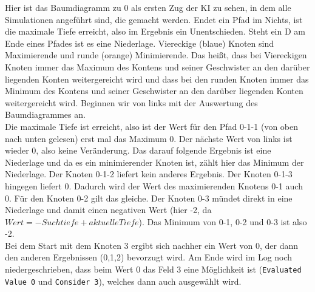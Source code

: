 \documentclass[12pt,a4paper]{article}
\def\code#1{\texttt{#1}}
\begin{document}
	Hier ist das Baumdiagramm zu 0 als ersten Zug der KI zu sehen, in dem alle Simulationen angeführt sind, die gemacht werden. Endet ein Pfad im Nichts, ist die maximale Tiefe erreicht, also im Ergebnis ein Unentschieden. Steht ein D am Ende eines Pfades ist es eine Niederlage. Viereckige (blaue) Knoten sind Maximierende und runde (orange) Minimierende. Das heißt, dass bei Viereckigen Knoten immer das Maximum des Kontens und seiner Geschwister an den darüber liegenden Konten weitergereicht wird und dass bei den runden Knoten immer das Minimum des Kontens und seiner Geschwister an den darüber liegenden Konten weitergereicht wird. Beginnen wir von links mit der Auswertung des Baumdiagrammes an.\\ Die maximale Tiefe ist erreicht, also ist der Wert für den Pfad 0-1-1 (von oben nach unten gelesen) erst mal das Maximum 0. Der nächste Wert von links ist wieder 0, also keine Veränderung. Das darauf folgende Ergebnis ist eine Niederlage und da es ein minimierender Knoten ist, zählt hier das Minimum der Niederlage. Der Knoten 0-1-2 liefert kein anderes Ergebnis. Der Knoten 0-1-3 hingegen liefert 0. Dadurch wird der Wert des maximierenden Knotens 0-1 auch 0. Für den Knoten 0-2 gilt das gleiche. Der Knoten 0-3 mündet direkt in eine Niederlage und damit einen negativen Wert (hier -2, da $Wert = - Suchtiefe + aktuelle Tiefe$). Das Minimum von 0-1, 0-2 und 0-3 ist also -2.\\
	Bei dem Start mit dem Knoten 3 ergibt sich nachher ein Wert von 0, der dann den anderen Ergebnissen (0,1,2) bevorzugt wird. Am Ende wird im Log noch niedergeschrieben, dass beim Wert 0 das Feld 3 eine Möglichkeit ist (\code{Evaluated Value 0} und \code{Consider 3}), welches dann auch ausgewählt wird.
	\newpage
\end{document}
